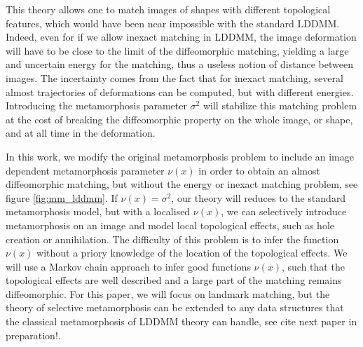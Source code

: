 \documentclass[runningheads]{llncs}
\begin{document}
This theory allows one to match images of shapes with different topological features, which would have been near impossible with the standard LDDMM. 
Indeed, even for if we allow inexact matching in LDDMM, the image deformation will have to be close to the limit of the diffeomorphic matching, yielding a large and uncertain energy for the matching, thus a useless notion of distance between images. 
The incertainty comes from the fact that for inexact matching, several almost trajectories of deformations can be computed, but with different energies.  
Introducing the metamorphosis parameter $\sigma^2$ will stabilize this matching problem at the cost of breaking the diffeomorphic property on the whole image, or shape, and at all time in the deformation. 

In this work, we modify the original metamorphosis problem to include an image dependent metamorphosis parameter $\nu(x)$ in order to obtain an almost diffeomorphic matching, but without the energy or inexact matching problem, see figure \ref{fig:mm_lddmm}. 
If $\nu(x) = \sigma^2$, our theory will reduces to the standard metamorphosis model, but with a localised $\nu(x)$, we can selectively introduce metamorphosis on an image and model local topological effects, such as hole creation or annihilation. 
The difficulty of this problem is to infer the function $\nu(x)$ without a priory knowledge of the location of the topological effects. 
We will use a Markov chain approach to infer good functions $\nu(x)$, such that the topological effects are well described and a large part of the matching remains diffeomorphic. 
For this paper, we will focus on landmark matching, but the theory of selective metamorphosis can be extended to any data structures that the classical metamorphosis of LDDMM theory can handle, see {\color{red} cite next paper in preparation!}. 
\end{document}
